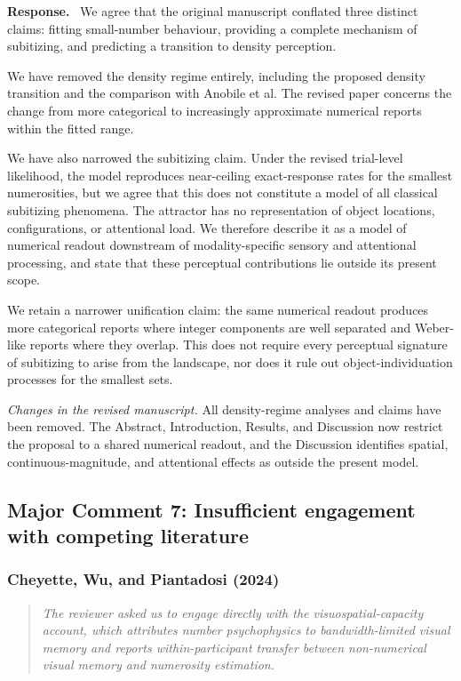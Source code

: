 \documentclass[11pt]{article}
\newenvironment{reviewercomment}{\begin{quote}\color{reviewgray}\itshape}{\end{quote}}
\newenvironment{authorresponse}{\par\noindent\textbf{\color{responseblue}Response.}\ }{\par}
\newcommand{\change}[1]{\par\noindent\textit{Changes in the revised manuscript.} #1\par}
\begin{document}
\begin{authorresponse}
We agree that the original manuscript conflated three distinct claims: fitting small-number behaviour, providing a complete mechanism of subitizing, and predicting a transition to density perception.

We have removed the density regime entirely, including the proposed density transition and the comparison with Anobile et al. The revised paper concerns the change from more categorical to increasingly approximate numerical reports within the fitted range.

We have also narrowed the subitizing claim. Under the revised trial-level likelihood, the model reproduces near-ceiling exact-response rates for the smallest numerosities, but we agree that this does not constitute a model of all classical subitizing phenomena. The attractor has no representation of object locations, configurations, or attentional load. We therefore describe it as a model of numerical readout downstream of modality-specific sensory and attentional processing, and state that these perceptual contributions lie outside its present scope.

We retain a narrower unification claim: the same numerical readout produces more categorical reports where integer components are well separated and Weber-like reports where they overlap. This does not require every perceptual signature of subitizing to arise from the landscape, nor does it rule out object-individuation processes for the smallest sets.
\end{authorresponse}

\change{All density-regime analyses and claims have been removed. The Abstract, Introduction, Results, and Discussion now restrict the proposal to a shared numerical readout, and the Discussion identifies spatial, continuous-magnitude, and attentional effects as outside the present model.}

\subsection*{Major Comment 7: Insufficient engagement with competing literature}

\subsubsection*{Cheyette, Wu, and Piantadosi (2024)}

\begin{reviewercomment}
The reviewer asked us to engage directly with the visuospatial-capacity account, which attributes number psychophysics to bandwidth-limited visual memory and reports within-participant transfer between non-numerical visual memory and numerosity estimation.
\end{reviewercomment}
\end{document}
